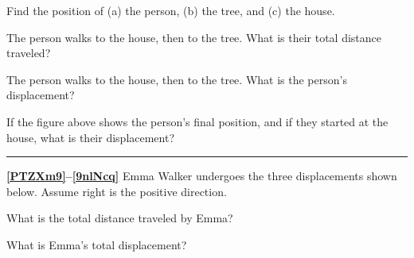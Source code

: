 \documentclass{article}
\begin{document}
\begin{exercise} \label{kE0eEH}
    Find the position of (a) the person, (b) the tree, and (c) the house.
\end{exercise}

\begin{exercise} \label{dOncsX}
    The person walks to the house, then to the tree. What is their total distance traveled?
\end{exercise}

\begin{exercise} \label{Ka0olk}
    The person walks to the house, then to the tree. What is the person's displacement?
\end{exercise}

\begin{exercise}
    If the figure above shows the person's final position, and if they started at the house, what is their displacement?
\end{exercise}

\hrule

\vspace{1em}

\textbf{\ref{PTZXm9}--\ref{9nlNcq}} Emma Walker undergoes the three displacements shown below. Assume right is the positive direction.

\begin{center}
\end{center}

\begin{exercise} \label{PTZXm9}
    What is the total distance traveled by Emma?
\end{exercise}

\begin{exercise} \label{9nlNcq}
    What is Emma's total displacement?
\end{exercise}
\end{document}

